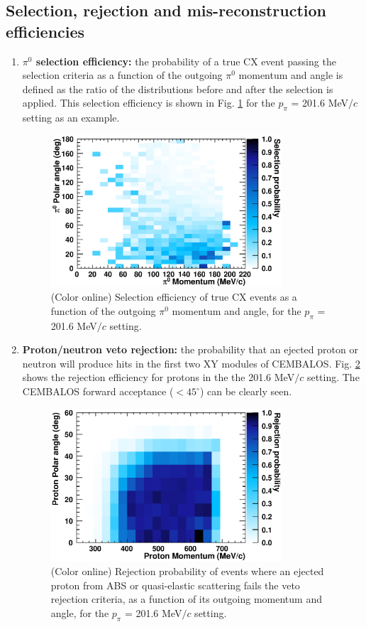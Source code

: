 \subsection{Selection, rejection and mis-reconstruction efficiencies}\label{sec:efficiencies}

\begin{enumerate}
\item{{\bf $\pi^0$ selection efficiency:} the probability of a true CX event passing the selection criteria as a function of the outgoing $\pi^0$ momentum and angle is defined as the ratio of the distributions before and after the selection is applied. This selection efficiency is shown in Fig. \ref{fig:pi0_selection} for the $p_{\pi}$ = 201.6 MeV$/c$ setting as an example.}

\begin{figure}[h]
 \includegraphics[width=86mm]{figures/Pi0SelectionEfficiency_200.eps}
 \caption{(Color online) Selection efficiency of true CX events as a function of the outgoing $\pi^{0}$ momentum and angle, for the $p_{\pi}$ = 201.6 MeV$/c$ setting.}
 \label{fig:pi0_selection}
\end{figure}

\item{{\bf Proton/neutron veto rejection:} the probability that an ejected proton or neutron will produce hits in the first two XY modules of CEMBALOS. Fig. \ref{fig:proton_rejection} shows the rejection efficiency for protons in the the 201.6 MeV$/c$ setting. The CEMBALOS forward acceptance ($<45^{\circ}$) can be clearly seen.}

\begin{figure}[h]
 \includegraphics[width=86mm]{figures/ProtonRejectionEfficiency_200.eps}
 \caption{(Color online) Rejection probability of events where an ejected proton from ABS or quasi-elastic scattering fails the veto rejection criteria, as a function of its outgoing  momentum and angle, for the $p_{\pi}$ = 201.6 MeV$/c$ setting.}
 \label{fig:proton_rejection}
\end{figure}


\end{enumerate}
